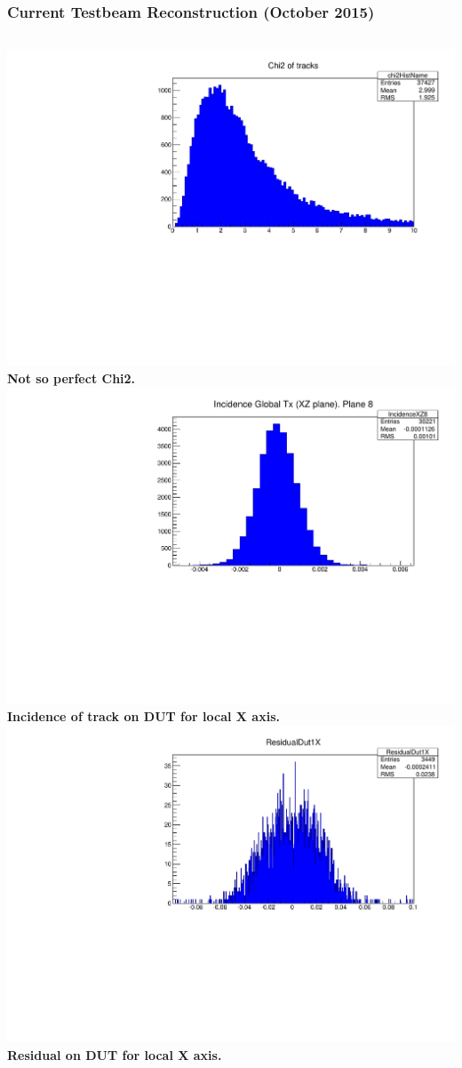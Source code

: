\documentclass{beamer}
\begin{document}
\begin{frame}
\frametitle{Current Testbeam Reconstruction (October 2015)}
\begin{columns}[t]
\centering
\includegraphics[width=0.9\linewidth]{pics/chi_new.pdf}\\
\tiny{\textbf{Not so perfect Chi2.}}\\
\includegraphics[width=0.9\linewidth]{pics/inc_new.pdf}\\
\tiny{\textbf{Incidence of track on DUT for local X axis. }}\\
\centering
\includegraphics[width=0.9\linewidth]{pics/Res_new.pdf}\\ 
\tiny{\textbf{Residual on DUT for local X axis.}}


\end{columns}
\end{frame}
\end{document}
